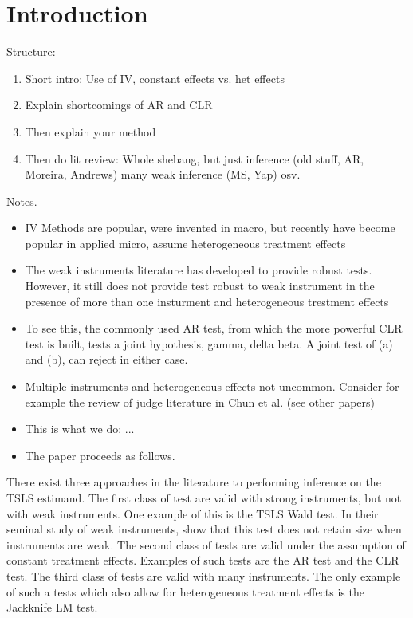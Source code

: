 \section{Introduction}



Structure:
\begin{enumerate}
    \item 
    Short intro: Use of IV, constant effects vs. het effects
    \item 
    Explain shortcomings of AR and CLR
    \item 
    Then explain your method
    \item 
    Then do lit review: Whole shebang, but just inference (old stuff, AR, Moreira, Andrews) many weak inference (MS, Yap) osv.
\end{enumerate}

Notes.

\begin{itemize}
    \item 
    IV Methods are popular, were invented in macro, but recently have become popular in applied micro, assume heterogeneous treatment effects
    \item 
    The weak instruments literature has developed to provide robust tests. However, it still does not provide test robust to weak instrument in the presence of more than one insturment and heterogeneous trestment effects
    \item 
    To see this, the commonly used AR test, from which the more powerful CLR test is built, tests a joint hypothesis, gamma, delta beta. A joint test of (a) and (b), can reject in either case.
    \item 
    Multiple instruments and heterogeneous effects not uncommon. Consider for example the review of judge literature in Chun et al. (see other papers)
    \item 
    This is what we do: ...
    \item 
    The paper proceeds as follows.
\end{itemize}


There exist three approaches in the literature to performing inference on the TSLS estimand. The first class of test are valid with strong instruments, but not with weak instruments. One example of this is the TSLS Wald test. In their seminal study of weak instruments, \cite{staigerInstrumentalVariablesRegression1997} show that this test does not retain size when instruments are weak. The second class of tests are valid under the assumption of constant treatment effects. Examples of such tests are the \cite{andersonEstimationParametersSingle1949} AR test and the \cite{moreiraConditionalLikelihoodRatio2003} CLR test. The third class of tests are valid with many instruments. The only example of such a tests which also allow for heterogeneous treatment effects is the \cite{yapInferenceManyWeak2025} Jackknife LM test.

